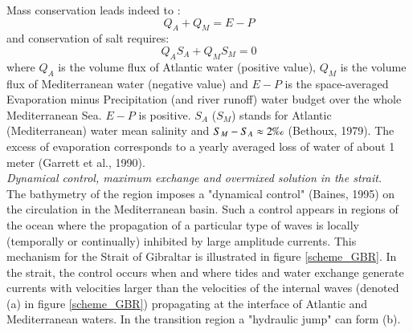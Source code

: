 Mass conservation leads indeed to : 
\begin{equation}  
	\label{Eq_mass}
    \displaystyle   
  	Q_A+Q_M = E-P
\end{equation}
and conservation of salt requires: 
\begin{equation}  
    \label{Eq_salt}
    \displaystyle   
    Q_A S_A + Q_M S_M =  0
\end{equation}
where $Q_A$ is the volume flux of Atlantic water (positive value), $Q_M$ is the volume flux of Mediterranean water (negative value) and $E-P$ is the space-averaged Evaporation minus Precipitation (and river runoff) water budget over the whole Mediterranean Sea. $E-P$ is positive. $S_A$ ($S_M$) stands for Atlantic (Mediterranean) water mean salinity and $S_M-S_A\approx 2\mbox{\textperthousand}$ (Bethoux, 1979). The excess of evaporation corresponds to a yearly averaged loss of water of about 1 meter (Garrett et al., 1990).\\

\textit{Dynamical control, maximum exchange and overmixed solution in the strait.}\\
The bathymetry of the region imposes a "dynamical control" (Baines, 1995) on the circulation in the Mediterranean basin. Such a control appears in regions of the ocean where the propagation of a particular type of waves is locally (temporally or continually) inhibited by large amplitude currents. This mechanism for the Strait of Gibraltar is illustrated in figure \ref{scheme_GBR}. In the strait, the control occurs when and where tides and water exchange generate currents with velocities larger than the velocities of the internal waves (denoted (a) in figure \ref{scheme_GBR}) propagating at the interface of Atlantic and Mediterranean waters. In the transition region a "hydraulic jump" can form (b).

